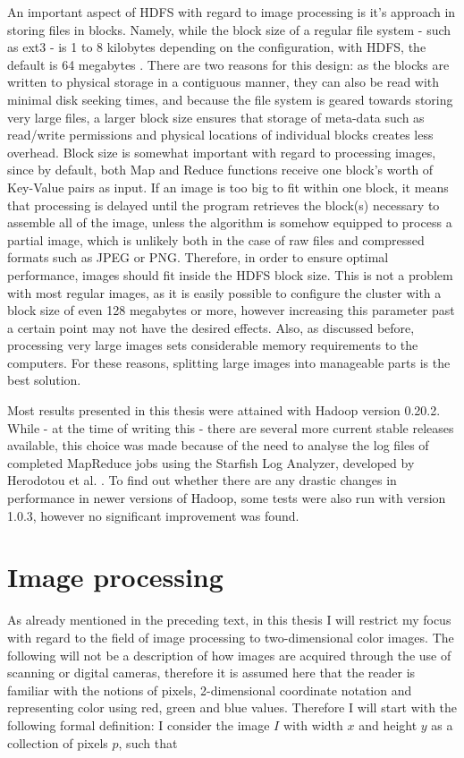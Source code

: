 \documentclass [12pt,a4paper]{report}
\begin{document}
An important aspect of HDFS with regard to image processing is it's approach in storing files in blocks. Namely, while the block size of a regular file system - such as ext3 - is 1 to 8 kilobytes depending on the configuration, with HDFS, the default is 64 megabytes \cite{ext3}. There are two reasons for this design: as the blocks are written to physical storage in a contiguous manner, they can also be read with minimal disk seeking times, and because the file system is geared towards storing very large files, a larger block size ensures that storage of meta-data such as read/write permissions and physical locations of individual blocks creates less overhead. 
Block size is somewhat important with regard to processing images, since by default, both Map and Reduce functions receive one block's worth of Key-Value pairs as input. If an image is too big to fit within one block, it means that processing is delayed until the program retrieves the block(s) necessary to assemble all of the image, unless the algorithm is somehow equipped to process a partial image, which is unlikely both in the case of raw files and compressed formats such as JPEG or PNG. Therefore, in order to ensure optimal performance, images should fit inside the HDFS block size. This is not a problem with most regular images, as it is easily possible to configure the cluster with a block size of even 128 megabytes or more, however increasing this parameter past a certain point may not have the desired effects. Also, as discussed before, processing very large images sets considerable memory requirements to the computers. For these reasons, splitting large images into manageable parts is the best solution.

Most results presented in this thesis were attained with Hadoop version 0.20.2. While - at the time of writing this - there are several more current stable releases available, this choice was made because of the need to analyse the log files of completed MapReduce jobs using the Starfish Log Analyzer, developed by Herodotou et al. \cite{herodotou2011starfish}. To find out whether there are any drastic changes in performance in newer versions of Hadoop, some tests were also run with version 1.0.3, however no significant improvement was found.

\section{Image processing}

As already mentioned in the preceding text, in this thesis I will restrict my focus with regard to the field of image processing to two-dimensional color images. The following will not be a description of how images are acquired through the use of scanning or digital cameras, therefore it is assumed here that the reader is familiar with the notions of pixels, 2-dimensional coordinate notation and representing color using red, green and blue values. Therefore I will start with the following formal definition: I consider the image $I$ with width $x$ and height $y$ as a collection of pixels $p$, such that
\end{document}
